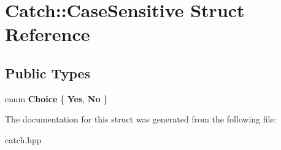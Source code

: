 \hypertarget{structCatch_1_1CaseSensitive}{}\section{Catch\+:\+:Case\+Sensitive Struct Reference}
\label{structCatch_1_1CaseSensitive}
\subsection*{Public Types}
\begin{DoxyCompactItemize}
\item 
enum {\bfseries Choice} \{ {\bfseries Yes}, 
{\bfseries No}
 \}\hypertarget{structCatch_1_1CaseSensitive_aad49d3aee2d97066642fffa919685c6a}{}\label{structCatch_1_1CaseSensitive_aad49d3aee2d97066642fffa919685c6a}

\end{DoxyCompactItemize}


The documentation for this struct was generated from the following file\+:\begin{DoxyCompactItemize}
\item 
catch.\+hpp\end{DoxyCompactItemize}
